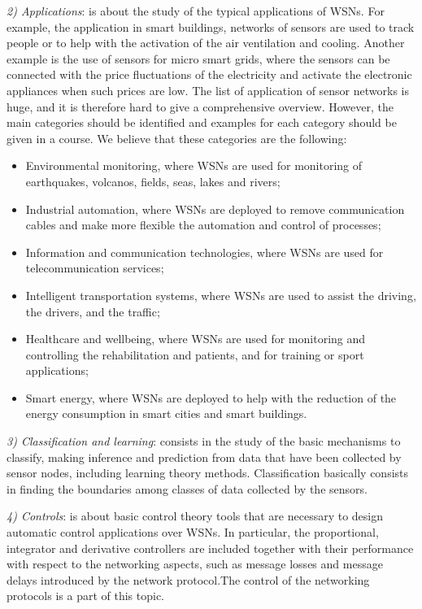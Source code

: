 \documentclass[onecolumn,12pt,draftclsnofoot,a4paper,peerreview]{IEEEtran}
\begin{document}
{\em 2) Applications}: is about the study of the typical applications of WSNs. For example, the application in smart buildings, networks of sensors are used to track people or to help with the activation of the air ventilation and cooling. Another example is the use of sensors for micro smart grids, where the sensors can be connected with the price fluctuations of the electricity and activate the electronic appliances when such prices are low. The list of application of sensor networks is huge, and it is therefore hard to give a comprehensive overview. However, the main categories should be identified and examples for each category should be given in a course. We believe that these categories are the following:
\begin{itemize}
\item Environmental monitoring, where WSNs are used for monitoring of earthquakes, volcanos, fields, seas, lakes and rivers;
\item Industrial automation, where WSNs are deployed to remove communication cables and make more flexible the automation and control of processes;
\item Information and communication technologies, where WSNs are used for telecommunication services;
\item Intelligent transportation systems, where WSNs are used to assist the driving, the drivers, and the traffic;
\item Healthcare and wellbeing, where WSNs are used for monitoring and controlling the rehabilitation and patients, and for training or sport applications;
\item Smart energy, where WSNs are deployed to help with the reduction of the energy consumption in smart cities and smart buildings.
\end{itemize}

{\em 3) Classification and learning}: consists in the study of the basic mechanisms to classify, making inference and prediction from data that have been collected by sensor nodes, including learning theory methods. Classification basically consists in finding the boundaries among classes of data collected by the sensors. 

{\em 4) Controls}: is about basic control theory tools that are necessary to design automatic control applications over WSNs. In particular, the proportional, integrator and derivative controllers are included together with their performance with respect to the networking aspects, such as message losses and message delays introduced by the network protocol.The control of the networking protocols is a part of this topic. 
\end{document}
